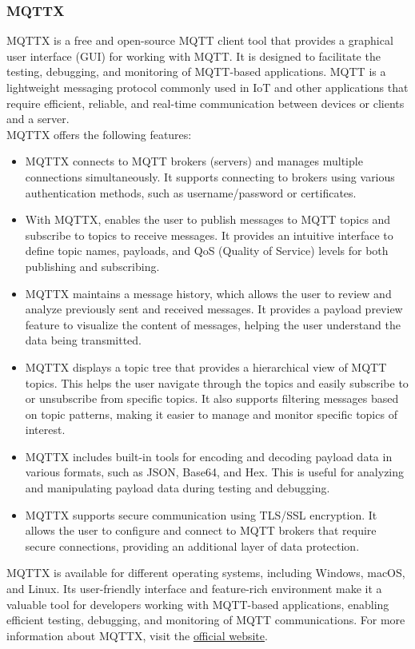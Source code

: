 \subsubsection{MQTTX}
MQTTX is a free and open-source \ac{MQTT} client tool that provides a graphical user interface (GUI) for working with \ac{MQTT}. It is designed to facilitate the testing, debugging, and monitoring of \ac{MQTT}-based applications. \ac{MQTT} is a lightweight messaging protocol commonly used in \ac{IoT} and other applications that require efficient, reliable, and real-time communication between devices or clients and a server.\vspace{5mm} \\
MQTTX offers the following features:
\begin{itemize}
  \item MQTTX connects to \ac{MQTT} brokers (servers) and manages multiple connections simultaneously. It supports connecting to brokers using various authentication methods, such as username/password or certificates.
  \item With MQTTX, enables the user to publish messages to \ac{MQTT} topics and subscribe to topics to receive messages. It provides an intuitive interface to define topic names, payloads, and QoS (Quality of Service) levels for both publishing and subscribing.
  \item MQTTX maintains a message history, which allows the user to review and analyze previously sent and received messages. It provides a payload preview feature to visualize the content of messages, helping the user understand the data being transmitted.
  \item MQTTX displays a topic tree that provides a hierarchical view of MQTT topics. This helps the user navigate through the topics and easily subscribe to or unsubscribe from specific topics. It also supports filtering messages based on topic patterns, making it easier to manage and monitor specific topics of interest.
  \item MQTTX includes built-in tools for encoding and decoding payload data in various formats, such as JSON, Base64, and Hex. This is useful for analyzing and manipulating payload data during testing and debugging.
  \item  MQTTX supports secure communication using TLS/SSL encryption. It allows the user to configure and connect to MQTT brokers that require secure connections, providing an additional layer of data protection.
\end{itemize}
MQTTX is available for different operating systems, including Windows, macOS, and Linux. Its user-friendly interface and feature-rich environment make it a valuable tool for developers working with MQTT-based applications, enabling efficient testing, debugging, and monitoring of MQTT communications.
For more information about MQTTX, visit the \href{https://mqttx.app/}{official website}.

